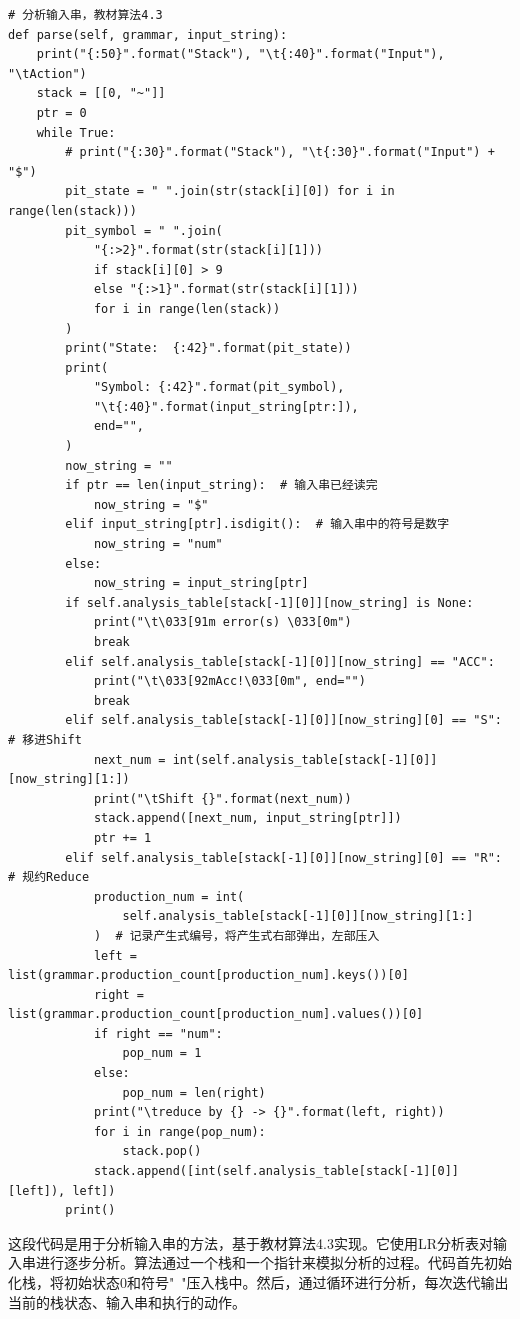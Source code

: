 \documentclass[lang=cn,11pt,a4paper]{elegantpaper}
\begin{document}
\begin{lstlisting}
# 分析输入串，教材算法4.3
def parse(self, grammar, input_string):
    print("{:50}".format("Stack"), "\t{:40}".format("Input"), "\tAction")
    stack = [[0, "~"]]
    ptr = 0
    while True:
        # print("{:30}".format("Stack"), "\t{:30}".format("Input") + "$")
        pit_state = " ".join(str(stack[i][0]) for i in range(len(stack)))
        pit_symbol = " ".join(
            "{:>2}".format(str(stack[i][1]))
            if stack[i][0] > 9
            else "{:>1}".format(str(stack[i][1]))
            for i in range(len(stack))
        )
        print("State:  {:42}".format(pit_state))
        print(
            "Symbol: {:42}".format(pit_symbol),
            "\t{:40}".format(input_string[ptr:]),
            end="",
        )
        now_string = ""
        if ptr == len(input_string):  # 输入串已经读完
            now_string = "$"
        elif input_string[ptr].isdigit():  # 输入串中的符号是数字
            now_string = "num"
        else:
            now_string = input_string[ptr]
        if self.analysis_table[stack[-1][0]][now_string] is None:
            print("\t\033[91m error(s) \033[0m")
            break
        elif self.analysis_table[stack[-1][0]][now_string] == "ACC":
            print("\t\033[92mAcc!\033[0m", end="")
            break
        elif self.analysis_table[stack[-1][0]][now_string][0] == "S":  # 移进Shift
            next_num = int(self.analysis_table[stack[-1][0]][now_string][1:])
            print("\tShift {}".format(next_num))
            stack.append([next_num, input_string[ptr]])
            ptr += 1
        elif self.analysis_table[stack[-1][0]][now_string][0] == "R":  # 规约Reduce
            production_num = int(
                self.analysis_table[stack[-1][0]][now_string][1:]
            )  # 记录产生式编号，将产生式右部弹出，左部压入
            left = list(grammar.production_count[production_num].keys())[0]
            right = list(grammar.production_count[production_num].values())[0]
            if right == "num":
                pop_num = 1
            else:
                pop_num = len(right)
            print("\treduce by {} -> {}".format(left, right))
            for i in range(pop_num):
                stack.pop()
            stack.append([int(self.analysis_table[stack[-1][0]][left]), left])
        print()
\end{lstlisting}

这段代码是用于分析输入串的方法，基于教材算法4.3实现。它使用LR分析表对输入串进行逐步分析。算法通过一个栈和一个指针来模拟分析的过程。代码首先初始化栈，将初始状态0和符号"~"压入栈中。然后，通过循环进行分析，每次迭代输出当前的栈状态、输入串和执行的动作。
\end{document}
